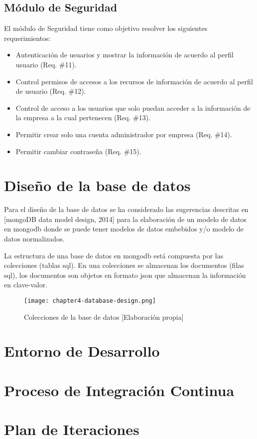 \subsection{Módulo de Seguridad}
\noindent El módulo de Seguridad tiene como objetivo resolver los siguientes requerimientos:
\begin{itemize}
\item Autenticación de usuarios y mostrar la información de acuerdo al perfil usuario (Req. \#11).
\item Control permisos de accesos a los recursos de información de acuerdo al perfil de usuario (Req. \#12).
\item Control de acceso a los usuarios que solo puedan acceder a la información de la empresa a la cual pertenecen (Req. \#13).
\item Permitir crear solo una cuenta administrador por empresa (Req. \#14).
\item Permitir cambiar contraseña (Req. \#15).
\end{itemize}

\section{Diseño de la base de datos}
\noindent Para el diseño de la base de datos se ha considerado las sugerencias descritas en [mongoDB data model design, 2014] para la elaboración de un modelo de datos en mongodb donde se puede tener modelos de datos embebidos y/o modelo de datos normalizados.

\noindent La estructura de una base de datos en mongodb está compuesta por las colecciones (tablas sql). En una colecciones se almacenan los documentos (filas sql), los documentos son objetos en formato json que almacenan la información en clave-valor.

\begin{figure}[H]
  \centering
  \texttt{[image: chapter4-database-design.png]}
  \caption{Colecciones de la base de datos [Elaboración propia]}  
\end{figure}

\section{Entorno de Desarrollo}

\section{Proceso de Integración Continua}

\section{Plan de Iteraciones}

 

